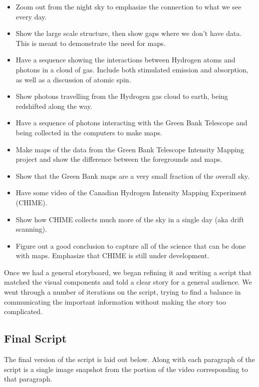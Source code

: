 \begin{itemize}
\item Zoom out from the night sky to emphasize the connection to what we see every day.
\item Show the large scale structure, then show gaps where we don't have data. This is meant to demonstrate the need for \cm maps.
\item Have a sequence showing the interactions between Hydrogen atoms and \cm photons in a cloud of gas. Include both stimulated emission and absorption, as well as a discussion of atomic spin.
\item Show photons travelling from the Hydrogen gas cloud to earth, being redshifted along the way. 
\item Have a sequence of photons interacting with the Green Bank Telescope and being collected in the computers to make maps.
\item Make maps of the data from the Green Bank Telescope Intensity Mapping project and show the difference between the foregrounds and \cm maps. 
\item Show that the Green Bank maps are a very small fraction of the overall sky.
\item Have some video of the Canadian Hydrogen Intensity Mapping Experiment (CHIME).
\item Show how CHIME collects much more of the sky in a single day (aka drift scanning). 
\item Figure out a good conclusion to capture all of the science that can be done with \cm maps. Emphasize that CHIME is still under development. 
\end{itemize}

Once we had a general storyboard, we began refining it and writing a script that matched the visual components and told a clear story for a general audience. We went through a number of iterations on the script, trying to find a balance in communicating the important information without making the story too complicated. 


\subsection{Final Script}

The final version of the script is laid out below. Along with each paragraph of the script is a single image snapshot from the portion of the video corresponding to that paragraph. 

